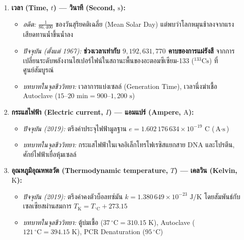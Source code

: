 \begin{enumerate}
    \item \textbf{เวลา (Time, $t$) --- วินาที (Second, $\text{s}$):}
    \begin{itemize}
        \item \textit{อดีต:} $\frac{1}{86{,}400}$ ของวันสุริยคติเฉลี่ย (Mean Solar Day) แต่พบว่าโลกหมุนช้าลงจากแรงเสียดทานน้ำขึ้นน้ำลง
        \item \textit{ปัจจุบัน (ตั้งแต่ 1967):} \textbf{ช่วงเวลาเท่ากับ $9{,}192{,}631{,}770$ คาบของการแผ่รังสี} จากการเปลี่ยนระดับพลังงานไฮเปอร์ไฟน์ในสถานะพื้นของอะตอมซีเซียม-133 ($^{133}\text{Cs}$) ที่ศูนย์สัมบูรณ์
        \item \textit{บทบาทในจุลชีววิทยา:} เวลาการแบ่งเซลล์ (Generation Time), เวลานึ่งฆ่าเชื้อ Autoclave ($15\text{--}20\text{ min} = 900\text{--}1{,}200\text{ s}$)
    \end{itemize}

    \item \textbf{กระแสไฟฟ้า (Electric current, $I$) --- แอมแปร์ (Ampere, $\text{A}$):}
    \begin{itemize}
        \item \textit{ปัจจุบัน (2019):} ตรึงค่าประจุไฟฟ้ามูลฐาน $e = 1.602\,176\,634 \times 10^{-19}\text{ C}$ ($\text{A}\cdot\text{s}$)
        \item \textit{บทบาทในจุลชีววิทยา:} กระแสไฟฟ้าในเจลอิเล็กโทรโฟเรซิสแยกสาย DNA และโปรตีน, ศักย์ไฟฟ้าเยื่อหุ้มเซลล์
    \end{itemize}

    \item \textbf{อุณหภูมิอุณหพลวัต (Thermodynamic temperature, $T$) --- เคลวิน (Kelvin, $\text{K}$):}
    \begin{itemize}
        \item \textit{ปัจจุบัน (2019):} ตรึงค่าคงตัวบ็อลทซ์มัน $k = 1.380\,649 \times 10^{-23}\text{ J/K}$ โดยสัมพันธ์กับเซลเซียสผ่านสมการ $T_{\text{K}} = T_{^\circ\text{C}} + 273.15$
        \item \textit{บทบาทในจุลชีววิทยา:} ตู้บ่มเชื้อ ($37\,^\circ\text{C} = 310.15\text{ K}$), Autoclave ($121\,^\circ\text{C} = 394.15\text{ K}$), PCR Denaturation ($95\,^\circ\text{C}$)
    \end{itemize}


\end{enumerate}
